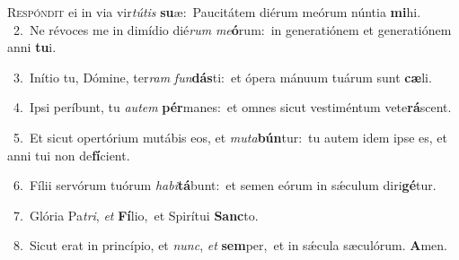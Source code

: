\lettrine{\initial\textcolor{\initialcolor}{R}}{espóndit} ei in via vir\-\textit{tú}\-\textit{tis} \textbf{su}\-æ:~\star Paucitátem diérum meórum núntia \textbf{mi}\-hi.\\
{\numbfont\textcolor{\numbcolor}{~2.}}~Ne révoces me in dimídio dié\textit{rum} \textit{me}\-\textbf{ó}rum:~\star in generatiónem et generatiónem anni \textbf{tu}\-i.\par
{\numbfont\textcolor{\numbcolor}{~3.}}~Inítio tu, Dómine, ter\textit{ram} \textit{fun}\-\textbf{dás}ti:~\star et ópera mánuum tuárum sunt \textbf{cæ}\-li.\par
{\numbfont\textcolor{\numbcolor}{~4.}}~Ipsi períbunt, tu \textit{au}\-\textit{tem} \textbf{pér}\-manes:~\star et omnes sicut vestiméntum vete\-\textbf{rá}\-scent.\par
{\numbfont\textcolor{\numbcolor}{~5.}}~Et sicut opertórium mutábis eos, et \textit{mu}\-\textit{ta}\textbf{bún}tur:~\star tu autem idem ipse es, et anni tui non de\-\textbf{fí}\-cient.\par
{\numbfont\textcolor{\numbcolor}{~6.}}~Fílii servórum tuórum \textit{ha}\-\textit{bi}\textbf{tá}bunt:~\star et semen eórum in sǽculum diri\-\textbf{gé}\-tur.\par
{\numbfont\textcolor{\numbcolor}{~7.}}~Glória Pa\-\textit{tri}\-, \textit{et} \textbf{Fí}\-lio,~\star et Spirítui \textbf{Sanc}\-to.\par
{\numbfont\textcolor{\numbcolor}{~8.}}~Sicut erat in princípio, et \textit{nunc}\-, \textit{et} \textbf{sem}\-per,~\star et in sǽcula sæculórum. \textbf{A}\-men.\par

